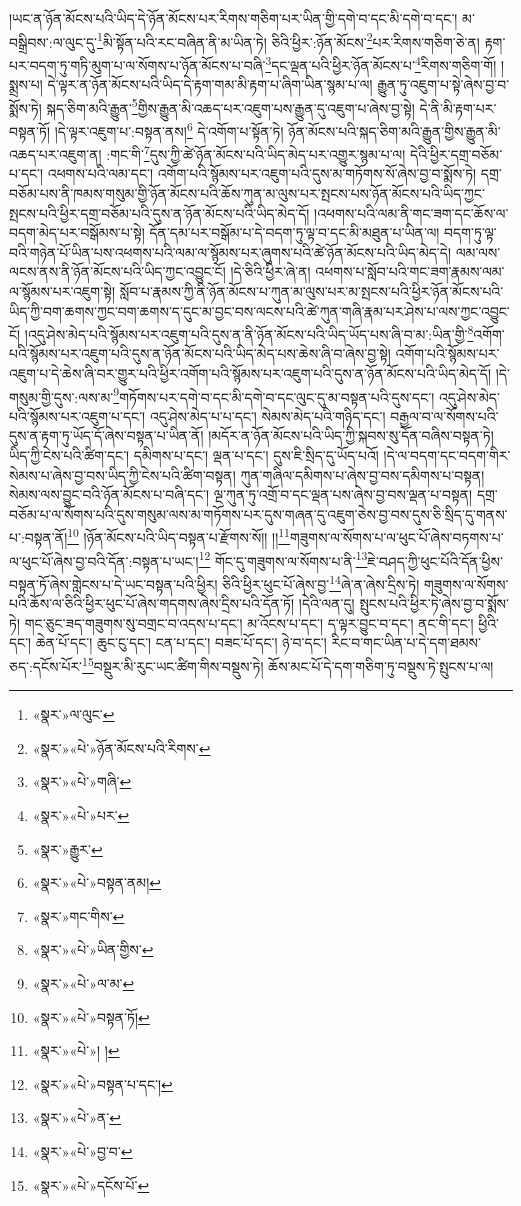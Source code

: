 །ཡང་ན་ཉོན་མོངས་པའི་ཡིད་དེ་ཉོན་མོངས་པར་རིགས་གཅིག་པར་ཡིན་གྱི་དགེ་བ་དང་མི་དགེ་བ་དང་། མ་བསྒྲིབས་:ལ་ལུང་དུ་\footnote{«སྣར་»ལ་ལུང་}མི་སྟོན་པའི་རང་བཞིན་ནི་མ་ཡིན་ཏེ། ཅིའི་ཕྱིར་:ཉོན་མོངས་\footnote{«སྣར་»«པེ་»ཉོན་མོངས་པའི་རིགས་}པར་རིགས་གཅིག་ཅེ་ན། རྟག་པར་བདག་ཏུ་གཏི་མུག་པ་ལ་སོགས་པ་ཉོན་མོངས་པ་བཞི་\footnote{«སྣར་»«པེ་»གཞི་}དང་ལྡན་པའི་ཕྱིར་ཉོན་མོངས་པ་\footnote{«སྣར་»«པེ་»པར་}རིགས་གཅིག་གོ། །སྨྲས་པ། དེ་ལྟར་ན་ཉོན་མོངས་པའི་ཡིད་དེ་རྟག་གམ་མི་རྟག་པ་ཞིག་ཡིན་སྙམ་པ་ལ། རྒྱུན་ཏུ་འཇུག་པ་སྟེ་ཞེས་བྱ་བ་སྨོས་ཏེ། སྐད་ཅིག་མའི་རྒྱུན་\footnote{«སྣར་»རྒྱུར་}གྱིས་རྒྱུན་མི་འཆད་པར་འཇུག་པས་རྒྱུན་དུ་འཇུག་པ་ཞེས་བྱ་སྟེ། དེ་ནི་མི་རྟག་པར་བསྟན་ཏོ། །དེ་ལྟར་འཇུག་པ་:བསྟན་ནས།\footnote{«སྣར་»«པེ་»བསྟན་ནམ།} དེ་འགོག་པ་སྟོན་ཏེ། ཉོན་མོངས་པའི་སྐད་ཅིག་མའི་རྒྱུན་གྱིས་རྒྱུན་མི་འཆད་པར་འཇུག་ན། :གང་གི་\footnote{«སྣར་»གང་གིས་}དུས་ཀྱི་ཚེ་ཉོན་མོངས་པའི་ཡིད་མེད་པར་འགྱུར་སྙམ་པ་ལ། དེའི་ཕྱིར་དགྲ་བཅོམ་པ་དང་། འཕགས་པའི་ལམ་དང་། འགོག་པའི་སྙོམས་པར་འཇུག་པའི་དུས་མ་གཏོགས་སོ་ཞེས་བྱ་བ་སྨོས་ཏེ། དགྲ་བཅོམ་པས་ནི་ཁམས་གསུམ་གྱི་ཉོན་མོངས་པའི་ཆོས་ཀུན་མ་ལུས་པར་སྤངས་པས་ཉོན་མོངས་པའི་ཡིད་ཀྱང་སྤངས་པའི་ཕྱིར་དགྲ་བཅོམ་པའི་དུས་ན་ཉོན་མོངས་པའི་ཡིད་མེད་དོ། །འཕགས་པའི་ལམ་ནི་གང་ཟག་དང་ཆོས་ལ་བདག་མེད་པར་བསྒོམས་པ་སྟེ། དོན་དམ་པར་བསྒོམ་པ་དེ་བདག་ཏུ་ལྟ་བ་དང་མི་མཐུན་པ་ཡིན་ལ། བདག་ཏུ་ལྟ་བའི་གཉེན་པོ་ཡིན་པས་འཕགས་པའི་ལམ་ལ་སྙོམས་པར་ཞུགས་པའི་ཚེ་ཉོན་མོངས་པའི་ཡིད་མེད་དེ། ལམ་ལས་ལངས་ནས་ནི་ཉོན་མོངས་པའི་ཡིད་ཀྱང་འབྱུང་ངོ། །དེ་ཅིའི་ཕྱིར་ཞེ་ན། འཕགས་པ་སློབ་པའི་གང་ཟག་རྣམས་ལམ་ལ་སྙོམས་པར་འཇུག་སྟེ། སློབ་པ་རྣམས་ཀྱི་ནི་ཉོན་མོངས་པ་ཀུན་མ་ལུས་པར་མ་སྤངས་པའི་ཕྱིར་ཉོན་མོངས་པའི་ཡིད་ཀྱི་བག་ཆགས་ཀྱང་བག་ཆགས་ད་དུང་མ་བྱང་བས་ལངས་པའི་ཚེ་ཀུན་གཞི་རྣམ་པར་ཤེས་པ་ལས་ཀྱང་འབྱུང་ངོ། །འདུ་ཤེས་མེད་པའི་སྙོམས་པར་འཇུག་པའི་དུས་ན་ནི་ཉོན་མོངས་པའི་ཡིད་ཡོད་པས་ཞི་བ་མ་:ཡིན་གྱི་\footnote{«སྣར་»«པེ་»ཡིན་གྱིས་}འགོག་པའི་སྙོམས་པར་འཇུག་པའི་དུས་ན་ཉོན་མོངས་པའི་ཡིད་མེད་པས་ཆེས་ཞི་བ་ཞེས་བྱ་སྟེ། འགོག་པའི་སྙོམས་པར་འཇུག་པ་དེ་ཆེས་ཞི་བར་གྱུར་པའི་ཕྱིར་འགོག་པའི་སྙོམས་པར་འཇུག་པའི་དུས་ན་ཉོན་མོངས་པའི་ཡིད་མེད་དོ། །དེ་གསུམ་གྱི་དུས་:ལས་མ་\footnote{«སྣར་»«པེ་»ལ་མ་}གཏོགས་པར་དགེ་བ་དང་མི་དགེ་བ་དང་ལུང་དུ་མ་བསྟན་པའི་དུས་དང་། འདུ་ཤེས་མེད་པའི་སྙོམས་པར་འཇུག་པ་དང་། འདུ་ཤེས་མེད་པ་པ་དང་། སེམས་མེད་པའི་གཉིད་དང་། བརྒྱལ་བ་ལ་སོགས་པའི་དུས་ན་རྟག་ཏུ་ཡོད་དོ་ཞེས་བསྟན་པ་ཡིན་ནོ། །མདོར་ན་ཉོན་མོངས་པའི་ཡིད་ཀྱི་སྐབས་སུ་དོན་བཞིས་བསྟན་ཏེ། ཡིད་ཀྱི་ངེས་པའི་ཚིག་དང་། དམིགས་པ་དང་། ལྡན་པ་དང་། དུས་ཇི་སྲིད་དུ་ཡོད་པའོ། །དེ་ལ་བདག་དང་བདག་གིར་སེམས་པ་ཞེས་བྱ་བས་ཡིད་ཀྱི་ངེས་པའི་ཚིག་བསྟན། ཀུན་གཞིལ་དམིགས་པ་ཞེས་བྱ་བས་དམིགས་པ་བསྟན། སེམས་ལས་བྱུང་བའི་ཉོན་མོངས་པ་བཞི་དང་། ལྔ་ཀུན་ཏུ་འགྲོ་བ་དང་ལྡན་པས་ཞེས་བྱ་བས་ལྡན་པ་བསྟན། དགྲ་བཅོམ་པ་ལ་སོགས་པའི་དུས་གསུམ་ལས་མ་གཏོགས་པར་དུས་གཞན་དུ་འཇུག་ཅེས་བྱ་བས་དུས་ཅི་སྲིད་དུ་གནས་པ་:བསྟན་ནོ།\footnote{«སྣར་»«པེ་»བསྟན་ཏོ།} །ཉོན་མོངས་པའི་ཡིད་བསྟན་པ་རྫོགས་སོ།། །།\footnote{«སྣར་»«པེ་»། །}གཟུགས་ལ་སོགས་པ་ལ་ཕུང་པོ་ཞེས་བཏགས་པ་ལ་ཕུང་པོ་ཞེས་བྱ་བའི་དོན་:བསྟན་པ་ཡང་།\footnote{«སྣར་»«པེ་»བསྟན་པ་དང་།} གོང་དུ་གཟུགས་ལ་སོགས་པ་ནི་\footnote{«སྣར་»«པེ་»ན་}ཇེ་བཤད་ཀྱི་ཕུང་པོའི་དོན་ཕྱིས་བསྟན་ཏོ་ཞེས་གླེངས་པ་དེ་ཡང་བསྟན་པའི་ཕྱིར། ཅིའི་ཕྱིར་ཕུང་པོ་ཞེས་བྱ་\footnote{«སྣར་»«པེ་»བྱ་བ་}ཞེ་ན་ཞེས་དྲིས་ཏེ། གཟུགས་ལ་སོགས་པའི་ཆོས་ལ་ཅིའི་ཕྱིར་ཕུང་པོ་ཞེས་གདགས་ཞེས་དྲིས་པའི་དོན་ཏོ། །དེའི་ལན་དུ། སྤུངས་པའི་ཕྱིར་ཏེ་ཞེས་བྱ་བ་སྨོས་ཏེ། གང་ཅུང་ཟད་གཟུགས་སུ་བགྲང་བ་འདས་པ་དང་། མ་འོངས་པ་དང་། ད་ལྟར་བྱུང་བ་དང་། ནང་གི་དང་། ཕྱིའི་དང་། ཆེན་པོ་དང་། ཆུང་ངུ་དང་། ངན་པ་དང་། བཟང་པོ་དང་། ཉེ་བ་དང་། རིང་བ་གང་ཡིན་པ་དེ་དག་ཐམས་ཅད་:དངོས་པོར་\footnote{«སྣར་»«པེ་»དངོས་པོ་}བསྡུར་མི་རུང་ཡང་ཚིག་གིས་བསྡུས་ཏེ། ཆོས་མང་པོ་དེ་དག་གཅིག་ཏུ་བསྡུས་ཏེ་སྤུངས་པ་ལ། 